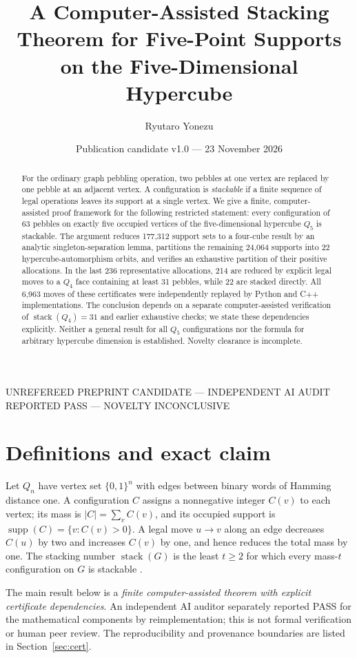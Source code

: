 \documentclass[11pt,a4paper]{article}
\title{A Computer-Assisted Stacking Theorem for Five-Point Supports on the Five-Dimensional Hypercube}
\author{Ryutaro Yonezu}
\date{Publication candidate v1.0 --- 23 November 2026}
\newcommand{\stack}{\operatorname{stack}}
\newcommand{\supp}{\operatorname{supp}}
\begin{document}
\maketitle
\begin{center}\small\textcolor{red!65!black}{UNREFEREED PREPRINT CANDIDATE --- INDEPENDENT AI AUDIT REPORTED PASS --- NOVELTY INCONCLUSIVE}\end{center}
\begin{abstract}
For the ordinary graph pebbling operation, two pebbles at one vertex are replaced by one pebble at an adjacent vertex. A configuration is \emph{stackable} if a finite sequence of legal operations leaves its support at a single vertex. We give a finite, computer-assisted proof framework for the following restricted statement: every configuration of 63 pebbles on exactly five occupied vertices of the five-dimensional hypercube $Q_5$ is stackable. The argument reduces 177,312 support sets to a four-cube result by an analytic singleton-separation lemma, partitions the remaining 24,064 supports into 22 hypercube-automorphism orbits, and verifies an exhaustive partition of their positive allocations. In the last 236 representative allocations, 214 are reduced by explicit legal moves to a $Q_4$ face containing at least 31 pebbles, while 22 are stacked directly. All 6,963 moves of these certificates were independently replayed by Python and C++ implementations. The conclusion depends on a separate computer-assisted verification of $\stack(Q_4)=31$ and earlier exhaustive checks; we state these dependencies explicitly. Neither a general result for all $Q_5$ configurations nor the formula for arbitrary hypercube dimension is established. Novelty clearance is incomplete.
\end{abstract}

\section{Definitions and exact claim}
Let $Q_n$ have vertex set $\{0,1\}^n$ with edges between binary words of Hamming distance one. A configuration $C$ assigns a nonnegative integer $C(v)$ to each vertex; its mass is $|C|=\sum_v C(v)$, and its occupied support is $\supp(C)=\{v:C(v)>0\}$. A legal move $u\to v$ along an edge decreases $C(u)$ by two and increases $C(v)$ by one, and hence reduces the total mass by one. The stacking number $\stack(G)$ is the least $t\ge 2$ for which every mass-$t$ configuration on $G$ is stackable \cite{CS2026}.

The main result below is a \emph{finite computer-assisted theorem with explicit certificate dependencies}. An independent AI auditor separately reported PASS for the mathematical components by reimplementation; this is not formal verification or human peer review. The reproducibility and provenance boundaries are listed in Section~\ref{sec:cert}.
\end{document}
